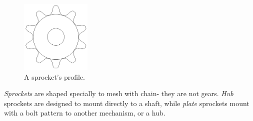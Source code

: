 \begin{figure}[H]
	\includegraphics[width=0.3\textwidth]{imgs/sprocket_profile.png}
	\caption{A sprocket's profile.}
\end{figure}

\textit{Sprockets} are shaped specially to mesh with chain- they are not gears. \textit{Hub} sprockets are designed to mount directly to a shaft, while \textit{plate} sprockets mount with a bolt pattern to another mechanism, or a hub.

